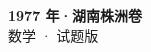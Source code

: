 \documentclass[zihao=-4, a4paper]{ctexart}
\begin{document}
\begin{center}
  {\Large\bfseries 1977 年·湖南株洲卷}\\[4pt]
  {\large 数学 · 试题版}
\end{center}
\medskip
{}

\end{document}
